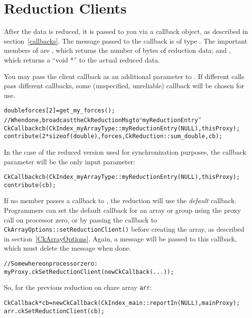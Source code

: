 \section{Reduction Clients}

\label{reductionClients}

After the data is reduced, it is passed to you via a callback object,
as described in section~\ref{callbacks}.  The message passed to
the callback is of type .
The important members of  are
, which returns the number of bytes of reduction data; and
, which returns a ``void *'' to the actual reduced data.

You may pass the client callback as an additional parameter to .
If different  calls pass different callbacks, some (unspecified,
unreliable) callback will be chosen for use.
\begin{alltt}
    double forces[2]=get_my_forces();
    // When done, broadcast the CkReductionMsg to ``myReductionEntry''
    CkCallback cb(CkIndex_myArrayType::myReductionEntry(NULL), thisProxy);
    contribute(2*sizeof(double), forces,CkReduction::sum_double, cb);
\end{alltt}

In the case of the reduced version used for synchronization purposes, the
callback parameter will be the only input parameter:
\begin{alltt}
    CkCallback cb(CkIndex_myArrayType::myReductionEntry(NULL), thisProxy);
    contribute(cb);
\end{alltt}

If no member passes a callback to , the reduction will use
the {\em default} callback. Programmers can set the default callback for an array or group
using the  proxy call on processor zero, or
by passing the callback to {\tt CkArrayOptions::setReductionClient()}
before creating the array, as described in section~\ref{CkArrayOptions}.
Again, a  message will be passed to this callback,
which must delete the message when done.

\begin{alltt}
    // Somewhere on processor zero:
    myProxy.ckSetReductionClient(new CkCallback(...));
\end{alltt}

So, for the previous reduction on chare array {\tt arr}:
\begin{alltt}
    CkCallback *cb = new CkCallback(CkIndex_main::reportIn(NULL),  mainProxy);
    arr.ckSetReductionClient(cb);
\end{alltt}

